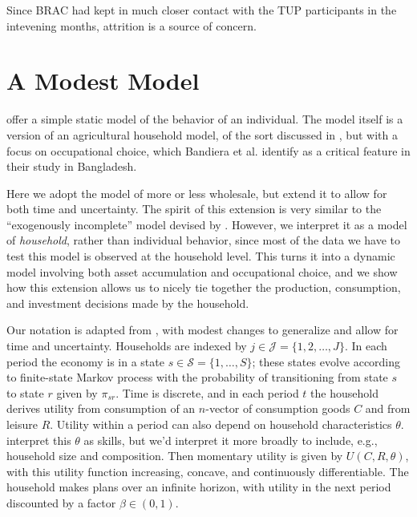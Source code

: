 \documentclass[11pt]{article}
\begin{document}
Since BRAC had kept in much closer contact with the TUP participants in the
intevening months, attrition is a source of concern.

\section*{A Modest Model}
\label{sec-4}

\cite{bandiera-etal12} offer a simple static model of the behavior of
an individual.  The model itself is a version of an agricultural
household model, of the sort discussed in \cite{Singh-etal86}, but
with a focus on occupational choice, which Bandiera et al. identify as a 
critical feature in their study in Bangladesh.

Here we adopt the model of \cite{bandiera-etal12} more or less
wholesale, but extend it to allow for both time and uncertainty.  The
spirit of this extension is very similar to the ``exogenously
incomplete'' model devised by \cite{Karaivanov-Townsend14}.  However,
we interpret it as a model of \emph{household}, rather than
individual behavior, since most of the data we have to test this
model is observed at the household level.  This turns it into a
dynamic model involving both asset accumulation and occupational
choice, and we show how this extension allows us to nicely tie
together the production, consumption, and investment decisions made
by the household.

Our notation is adapted from \cite{bandiera-etal12}, with modest
changes to generalize and allow for time and uncertainty.  Households
are indexed by $j\in\mathcal{J}=\{1,2,\dots,J\}$.  In each
period the economy is in a state $s\in\mathcal{S}=\{1,\dots,S\}$;
these states evolve according to finite-state Markov process with the
probability of transitioning from state $s$ to state $r$ given by
$\pi_{sr}$.  Time is discrete, and in each period $t$ the household
derives utility from consumption of an \(n\)-vector of consumption goods
$C$ and from leisure $R$.  Utility within a period can also depend on
household characteristics $\theta$.  \cite{bandiera-etal12} interpret
this $\theta$ as skills, but we'd interpret it more broadly to include,
e.g., household size and composition.  Then momentary utility is given
by $U(C,R,\theta)$, with this utility function increasing, concave,
and continuously differentiable.  The household makes plans over an
infinite horizon, with utility in the next period discounted by a
factor $\beta\in(0,1)$.
\end{document}
